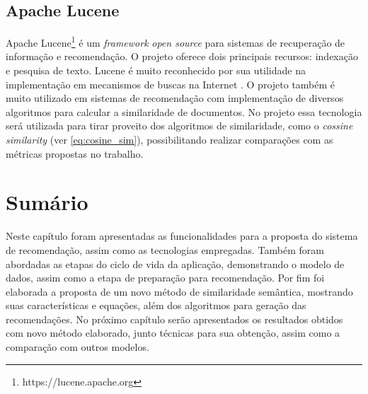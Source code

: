 \subsection{Apache Lucene}

Apache Lucene\footnote{https://lucene.apache.org} é um \textit{framework} \textit{open source} para sistemas de recuperação de informação e recomendação. O projeto oferece dois principais recursos: indexação e pesquisa de texto. Lucene é muito reconhecido por sua utilidade na implementação em mecanismos de buscas na Internet \citep{McCandless2010}. O projeto também é muito utilizado em sistemas de recomendação com implementação de diversos algoritmos para calcular a similaridade de documentos.
No projeto essa tecnologia será utilizada para tirar proveito dos algoritmos de similaridade, como o \textit{cossine similarity} (ver \ref{eq:cosine_sim}), possibilitando realizar comparações com as métricas propostas no trabalho.

\section{Sumário}

Neste capítulo foram apresentadas as funcionalidades para a proposta do sistema de recomendação, assim como as tecnologias empregadas. Também foram abordadas as etapas do ciclo de vida da aplicação, demonstrando o modelo de dados, assim como a etapa de preparação para recomendação. Por fim foi elaborada a proposta de um novo método de similaridade semântica, mostrando suas características e equações, além dos algoritmos para geração das recomendações. No próximo capítulo serão apresentados os resultados obtidos com novo método elaborado, junto técnicas para sua obtenção, assim como a comparação com outros modelos.
